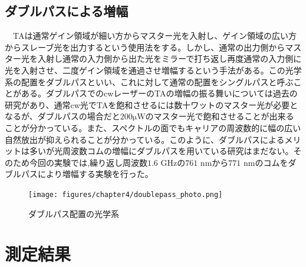 \documentclass[uplatex, dvipdfmx, a4paper, report, papersize, 11pt]{jsbook}
\begin{document}
\subsection{ダブルパスによる増幅}
 　TAは通常ゲイン領域が細い方からマスター光を入射し、ゲイン領域の広い方からスレーブ光を出力するという使用法をする。しかし、通常の出力側からマスター光を入射し通常の入力側から出た光をミラーで打ち返し再度通常の入力側に光を入射させ、二度ゲイン領域を通過させ増幅するという手法がある。この光学系の配置をダブルパスといい、これに対して通常の配置をシングルパスと呼ぶことがある。ダブルパスでのcwレーザーのTAの増幅の振る舞いについては過去の研究\cite{doi:10.1063/1.3501966}があり、通常cw光でTAを飽和させるには数十ワットのマスター光が必要となるが、ダブルパスの場合だと$200 \mathrm{\mu W}$のマスター光で飽和させることが出来ることが分かっている。また、スペクトルの面でもキャリアの周波数的に幅の広い自然放出が抑えられることが分かっている。このように、ダブルパスによるメリットは多いが光周波数コムの増幅にダブルパスを用いている研究はまだない。そのため今回の実験では,繰り返し周波数$1.6$ GHzの$761$ nmから$771$ nmのコムをダブルパスにより増幅する実験を行った。

 \begin{figure}[htbp]
  \begin{center}
   \texttt{[image: figures/chapter4/doublepass\_photo.png]}
 \end{center}
  \caption{ダブルパス配置の光学系}
  \label{doublepass_photo}
 \end{figure}

\newpage
\section{測定結果}
\end{document}

